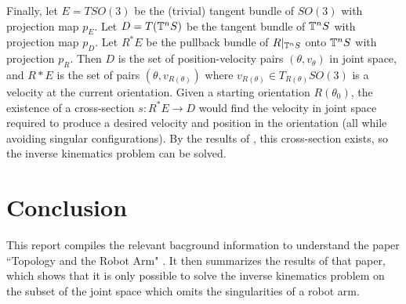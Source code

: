 \documentclass[12pt]{article}
\theoremstyle{definition}
\begin{document}
Finally, let \(E = TSO(3)\) be the (trivial) tangent
bundle of \(SO(3)\) with projection map \(p_E\). Let \(D = T(\mathbb{T}^n\\S)\) be
the tangent bundle of \(\mathbb{T}^n\\S\) with projection map \(p_D\).
Let \(R^*E\) be the pullback bundle of \(R|_{\mathbb{T}^n\\S}\) onto
\(\mathbb{T}^n\\S\) with projection \(p_R\). 
Then \(D\) is the set of position-velocity pairs
\((\theta, v_\theta)\) in joint space, and \(R*E\) is the set of pairs
\((\theta, v_{R(\theta)})\) where \(v_{R(\theta)} \in T_{R(\theta)}SO(3)\) 
is a velocity at the current orientation. 
Given a starting orientation \(R(\theta_0)\), the existence of a
cross-section \(s : R^*E \rightarrow D\) would find the velocity in joint space
required to produce a desired velocity and position in the orientation (all while
avoiding singular configurations). By the results of
\cite{robots-fiber-bundles}, this cross-section exists, so the inverse
kinematics problem can be solved.

\section{Conclusion}
This report compiles the relevant bacground information to understand the paper
``Topology and the Robot Arm"
\cite{topology-robot-arm}. It then summarizes the results of that paper, which
shows that it is only possible to solve the inverse kinematics problem on the
subset of the joint space which omits the singularities of a robot arm.

\printbibliography
\end{document}
